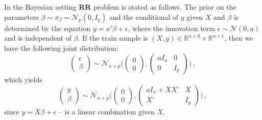 \documentclass[a4paper,14pt]{article}
\newcommand{\Ncal}{\mathcal{N}}
\newcommand{\Real}{\mathbb{R}}
\begin{document}
In the Bayesian setting \textbf{RR} problem is stated as follows. The prior on the
parameters $\beta \sim \pi_\beta = \Ncal_p(0, I_p)$ and the conditional of $y$ given $X$
and $\beta$ is determined by the equation $y = x'\beta + \epsilon$, where the innovation
term $\epsilon\sim \Ncal(0, a)$ and is independent of $\beta$. If the train sample is
$(X, y)\in \Real^{n\times d} \times \Real^{n\times 1}$, then we have the following
joint distribution:
$$ \begin{pmatrix} \epsilon\\ \beta \end{pmatrix}
  \sim \Ncal_{n+p}\biggl(
      \begin{pmatrix} 0 \\ 0 \end{pmatrix},
      \begin{pmatrix} a I_n & 0 \\ 0 & I_p \end{pmatrix}
    \biggr)
  \,, $$
which yields
$$ \begin{pmatrix} y\\ \beta \end{pmatrix}
  \sim \Ncal_{n+p}\biggl(
      \begin{pmatrix} 0 \\ 0 \end{pmatrix},
      \begin{pmatrix}
        a I_n + XX' & X \\
        X' & I_p
      \end{pmatrix}
    \biggr)
  \,, $$
since $y = X\beta + \epsilon$ -- is a linear combination given $X$.
\end{document}
